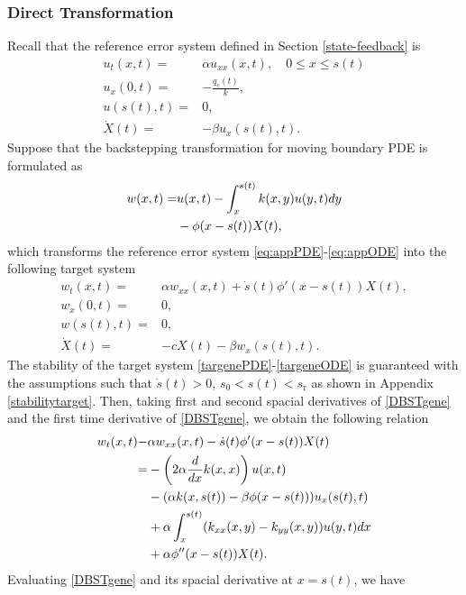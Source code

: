 \documentclass[journal]{IEEEtran}
\begin{document}
\subsubsection{Direct Transformation}\label{appDBST}
Recall that the reference error system defined  in Section \ref{state-feedback} is 
\begin{align}\label{eq:appPDE}
u_{t}(x,t) =& \alpha u_{xx}(x,t), \quad 0\leq x\leq s(t)\\
 \label{eq:appBC1}u_x(0,t) =& -\frac{q_{{\mathrm c}}(t)}{k},\\
 \label{eq:appBC2}u(s(t),t) =&0,\\
\label{eq:appODE}\dot{X}(t) =&-\beta u_x(s(t),t).
\end{align}
Suppose that the backstepping transformation for moving boundary PDE is formulated as
\begin{align}\label{DBSTgene}
w(x,t)=&u(x,t)- \int_{x}^{s(t)} k(x,y)u(y,t) dy\notag\\
&-\phi(x-s(t)) X(t), 
\end{align}
which transforms the reference error system \eqref{eq:appPDE}-\eqref{eq:appODE} into the following target system 
\begin{align}\label{targenePDE}
w_t(x,t)=&\alpha w_{xx}(x,t)+\dot{s}(t)\phi'(x-s(t))X(t), \\
w_{x}(0,t) =& 0, \\
\label{targeneBC2}w(s(t),t) =& 0, \\
\label{targeneODE}\dot{X}(t) =& -cX(t) - \beta w_{x}(s(t),t). 
\end{align}
The stability of the target system \eqref{targenePDE}-\eqref{targeneODE} is guaranteed with the assumptions such that $\dot{s}(t)>0$, $s_0<s(t)<s_{{\mathrm r}}$ as shown in Appendix \ref{stabilitytarget}. 
Then, taking first and second spacial derivatives of \eqref{DBSTgene} and the first time derivative of \eqref{DBSTgene}, we obtain the following relation 
\begin{align}\label{kerPDE}
w_t(x,t)-&\alpha w_{xx}(x,t)-\dot{s}(t)\phi'(x-s(t))X(t)\notag\\
=&-\left(2\alpha \frac{d}{dx}k(x,x)\right)u(x,t)\nonumber\\
&-(\alpha k(x,s(t))-\beta\phi(x-s(t))) u_x(s(t),t)\notag\\
&+ \alpha \int_{x}^{s(t)} (k_{xx}(x,y)-k_{yy}(x,y))u(y,t) dx\nonumber\\
&+\alpha \phi''(x-s(t)) X(t).
\end{align}
Evaluating  \eqref{DBSTgene} and its spacial derivative at $x=s(t)$, we have 
\end{document}
